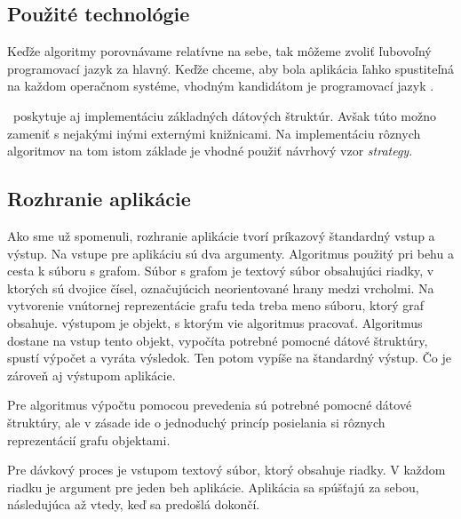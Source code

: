 \subsection{Použité technológie}

Keďže algoritmy porovnávame relatívne na sebe, tak môžeme zvoliť ľubovoľný 
programovací jazyk za hlavný. Keďže chceme, aby bola aplikácia ľahko 
spustiteľná na každom operačnom systéme, vhodným kandidátom je programovací 
jazyk \Java .

\Java\ poskytuje aj implementáciu základných dátových štruktúr. Avšak túto možno 
zameniť s nejakými inými externými knižnicami. Na implementáciu rôznych 
algoritmov na tom istom základe je vhodné použiť návrhový vzor \emph{strategy}.

\subsection{Rozhranie aplikácie}

Ako sme už spomenuli, rozhranie aplikácie tvorí príkazový štandardný vstup a 
výstup. Na vstupe pre aplikáciu sú dva argumenty. Algoritmus použitý pri behu a 
cesta k súboru s grafom. Súbor s grafom je textový súbor obsahujúci riadky, 
v ktorých sú dvojice čísel, označujúcich neorientované hrany medzi vrcholmi. 
Na vytvorenie vnútornej reprezentácie grafu teda treba meno súboru, ktorý graf 
obsahuje. výstupom je objekt, s ktorým vie algoritmus pracovať. Algoritmus 
dostane na vstup tento objekt, vypočíta potrebné pomocné dátové štruktúry, 
spustí výpočet a vyráta výsledok. Ten potom vypíše na štandardný výstup. Čo je 
zároveň aj výstupom aplikácie.

Pre algoritmus výpočtu pomocou prevedenia sú potrebné pomocné dátové štruktúry, 
ale v zásade ide o jednoduchý princíp posielania si rôznych reprezentácií grafu 
objektami.

Pre dávkový proces je vstupom textový súbor, ktorý obsahuje riadky. V každom 
riadku je argument pre jeden beh aplikácie. Aplikácia sa spúšťajú za sebou, 
následujúca až vtedy, keď sa predošlá dokončí.


